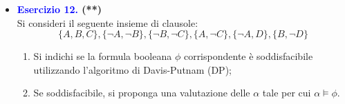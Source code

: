 \documentclass[a4paper,10pt]{article}
\makeatletter
\newcommand{\EsercitazioneNum}{11}
\newcommand{\Data}{28/11/2025}
\newcommand{\DocType}{Esercitazione} %
\newcommand{\FullTitle}{\DocType\ \EsercitazioneNum}
\newcommand{\Header}{
\noindent
  \small \textbf{Computabilità, Complessità e Logica - a.a. 2025/26} \hfill \textbf{\FullTitle} \\[0.2cm]
  \scriptsize Matteo Liotta, \texttt{matteo.liotta@studenti.units.it} \hfill \Data \\[0.2cm]
  \noindent\makebox[\linewidth]{\rule{\linewidth}{0.4pt}} \\[0.3cm]}
\newcommand{\NewPageHeader}{
  \vfill
  \noindent\makebox[\linewidth]{\rule{\linewidth}{0.4pt}}
  \newpage
  {\Header}
}
\makeatother
\begin{document}
{\begin{itemize}[label=, leftmargin=0pt]
\begin{osservazioni}
    \underline{\textit{Soluzione.}}\\
    $$S_0 = \{\lnot A,B\}, \{\lnot B,C\}, \{\lnot C,D\},\{\lnot D,A\},\{\lnot A, \lnot C\},\{B, C\}$$
    
    \textbf{1.} Pivot $A$
    \begin{itemize}
        \item \textbf{\textit{Clausole esonerate:}} $\{\lnot B,C\}, \{\lnot C,D\},\{B, C\}$
        \item \textbf{\textit{Risolventi:}} $\{B, \lnot D\}, \{\lnot C, \lnot D\}$
    \end{itemize}
    $$S_1 = \{\lnot B,C\}, \{\lnot C,D\},\{B, C\},\{B, \lnot D\}, \{\lnot C, \lnot D\}$$

    \textbf{2.} Pivot $B$
    \begin{itemize}
        \item \textbf{\textit{Clausole esonerate:}} $\{\lnot C,D\}, \{\lnot C, \lnot D\}$
        \item \textbf{\textit{Risolventi:}} $\{C\}, \{\lnot D,C\}$
    \end{itemize}
    $$S_2 = \{\lnot C,D\}, \{\lnot C, \lnot D\}, \{C\}, \{\lnot D,C\}$$

    \textbf{3.} Pivot $C$
    \begin{itemize}
        \item \textbf{\textit{Clausole esonerate:}} $\emptyset$
        \item \textbf{\textit{Risolventi:}} $\{D\},\{\lnot D\}, \{D,\lnot D\},\{\lnot D\}$
    \end{itemize}
\end{osservazioni}
\NewPageHeader
\begin{osservazioni}
    $$S_3 = \{D\},\{\lnot D\}, \{D,\lnot D\},\{\lnot D\}=\{D\},\{\lnot D\},\{\lnot D\}$$\\
    
    Da cui si osserva che si origina clausola vuota da $\{D\},\{\lnot D\}$. Ne segue l'insoddisfacibilità della formula booleana corrispondente.
\end{osservazioni}
    
    \item \textbf{\textcolor{blue}{Esercizio 12.} (**)}\\ 	
    Si consideri il seguente insieme di clausole:
    $$\{A, B, C\}, \{\lnot A, \lnot B\}, \{\lnot B, \lnot C\}, \{A, \lnot C\}, \{\lnot A, D\}, \{B, \lnot D\}$$
    \begin{enumerate}
        \item Si indichi se la formula booleana $\phi$ corrispondente è soddisfacibile utilizzando l'algoritmo di Davis-Putnam (DP);
        \item Se soddisfacibile, si proponga una valutazione delle  $\alpha$ tale per cui $\alpha\models\phi$.\\[0.2cm]
    \end{enumerate}


\end{itemize}}
\end{document}
